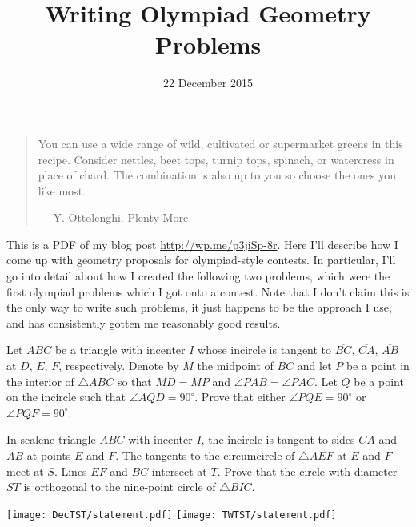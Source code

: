 \documentclass[11pt]{scrartcl}
\begin{document}
\title{Writing Olympiad Geometry Problems}
\date{22 December 2015}
\maketitle

\begin{quote}
  \sffamily\small
  You can use a wide range of wild, cultivated or supermarket greens in this recipe.
  Consider nettles, beet tops, turnip tops, spinach, or watercress in place of chard.
  The combination is also up to you so choose the ones you like most.

  \medskip

  --- Y. Ottolenghi. Plenty More
\end{quote}

This is a PDF of my blog post \url{http://wp.me/p3jiSp-8r}.
Here I'll describe how I come up with geometry proposals
for olympiad-style contests. In particular, I'll go into detail
about how I created the following two problems,
which were the first olympiad problems which I got onto a contest.
Note that I don't claim this is the only way to write such problems,
it just happens to be the approach I use, and has consistently
gotten me reasonably good results.

\begin{olyprob}
  Let $ABC$ be a triangle with incenter $I$ whose incircle is tangent to
  $\overline{BC}$, $\overline{CA}$, $\overline{AB}$ at $D$, $E$, $F$,
  respectively.  Denote by $M$ the midpoint of $\overline{BC}$ and
  let $P$ be a point in the interior of $\triangle ABC$
  so that $MD = MP$ and $\angle PAB = \angle PAC$.
  Let $Q$ be a point on the incircle such that $\angle AQD = 90^{\circ}$.
  Prove that either $\angle PQE = 90^{\circ}$ or $\angle PQF = 90^{\circ}$.
\end{olyprob}


\begin{olyprob}
  In scalene triangle $ABC$ with incenter $I$, the incircle is tangent to
  sides $CA$ and $AB$ at points $E$ and $F$.
  The tangents to the circumcircle of $\triangle AEF$ at $E$ and $F$ meet at $S$.
  Lines $EF$ and $BC$ intersect at $T$.
  Prove that the circle with diameter $ST$ is orthogonal to
  the nine-point circle of $\triangle BIC$.
\end{olyprob}

\begin{center}
  \texttt{[image: DecTST/statement.pdf]}
  \texttt{[image: TWTST/statement.pdf]}
\end{center}
\end{document}
